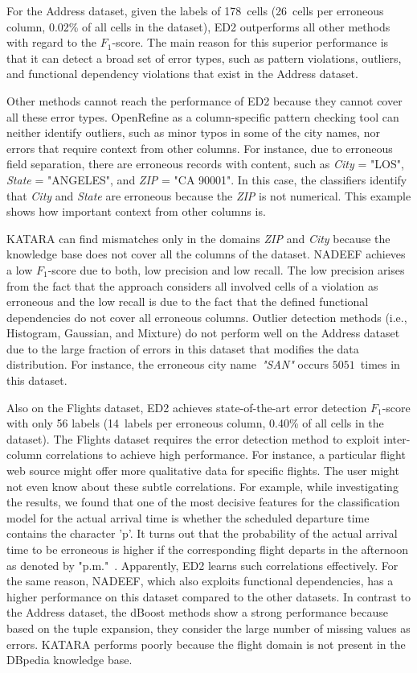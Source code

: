 For the Address dataset, given the labels of 178~cells (26~cells per erroneous column, 0.02\% of all cells in the dataset), ED2 outperforms all other methods with regard to the $F_1$-score. 
The main reason for this superior performance is that it can detect a broad set of error types, such as pattern violations, outliers, and functional dependency violations that exist in the Address dataset. 

Other methods cannot reach the performance of ED2 because they cannot cover all these error types. OpenRefine as a column-specific pattern checking tool can neither identify outliers, such as minor typos in some of the city names, nor errors that require context from other columns. For instance, due to erroneous field separation, there are erroneous records with content, such as \emph{City} = "LOS", \emph{State} = "ANGELES", and \emph{ZIP} = "CA 90001".
In this case, the classifiers identify that \emph{City} and \emph{State} are erroneous because the \emph{ZIP} is not numerical. This example shows how important context from other columns is.

KATARA can find mismatches only in the domains \emph{ZIP} and \emph{City} because the knowledge base does not cover all the columns of the dataset.
NADEEF achieves a low $F_1$-score due to both, low precision and low recall. The low precision arises from the fact that the approach considers all involved cells of a violation as erroneous and the low recall is due to the fact that the defined functional dependencies do not cover all erroneous columns. 
Outlier detection methods (i.e., Histogram, Gaussian, and Mixture) do not perform well on the Address dataset due to the large fraction of errors in this dataset that modifies the data distribution. For instance, the erroneous city name~\emph{"SAN"} occurs $5051$~times in this dataset.

Also on the Flights dataset, ED2 achieves state-of-the-art error detection $F_1$-score with only 56 labels (14~labels per erroneous column, 0.40\% of all cells in the dataset).
The Flights dataset requires the error detection method to exploit inter-column correlations to achieve high performance. For instance, a particular flight web source might offer more qualitative data for specific flights. The user might not even know about these subtle correlations. For example, while investigating the results, we found that one of the most decisive features for the classification model for the actual arrival time is whether the scheduled departure time contains the character 'p'. It turns out that the probability of the actual arrival time to be erroneous is higher if the corresponding flight departs in the afternoon as denoted by "p.m."~\cite{us2018air}.
Apparently, ED2 learns such correlations effectively.
For the same reason, NADEEF, which also exploits functional dependencies, has a higher performance on this dataset compared to the other datasets.
In contrast to the Address dataset, the dBoost methods show a strong performance because based on the tuple expansion, they consider the large number of missing values as errors.
KATARA performs poorly because the flight domain is not present in the DBpedia knowledge base.

